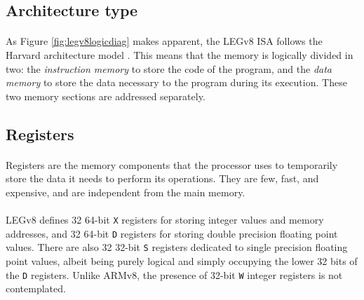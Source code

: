 \subsection{Architecture type}
\paragraph{}
As Figure \ref{fig:legv8logicdiag} makes apparent, the LEGv8 ISA follows the Harvard architecture model \cite{harvardarchweb}.  This means that the memory is logically divided in two: the \emph{instruction memory} to store the code of the program, and the \emph{data memory} to store the data necessary to the program during its execution. These two memory sections are addressed separately.
\subsection{Registers}\label{chap:chap1registers}
\paragraph{}
Registers are the memory components that the processor uses to temporarily store the data it needs to perform its operations. They are few, fast, and expensive, and are independent from the main memory.
\paragraph{}
LEGv8 defines 32 64-bit \verb|X| registers for storing integer values and memory addresses, and 32 64-bit \verb|D| registers for storing double precision floating point values. There are also 32 32-bit \verb|S| registers dedicated to single precision floating point values, albeit being purely logical and simply occupying the lower 32 bits of the \verb|D| registers. Unlike ARMv8, the presence of 32-bit \verb|W| integer registers is not contemplated.
